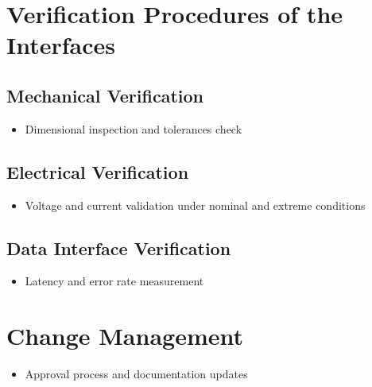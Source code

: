 \documentclass{article}
\begin{document}
\section{Verification Procedures of the Interfaces}

\subsection{Mechanical Verification}
\begin{itemize}
    \item Dimensional inspection and tolerances check
\end{itemize}

\subsection{Electrical Verification}
\begin{itemize}
    \item Voltage and current validation under nominal and extreme conditions
\end{itemize}

\subsection{Data Interface Verification}
\begin{itemize}
    \item Latency and error rate measurement
\end{itemize}


\section{Change Management}

\begin{itemize}
    \item Approval process and documentation updates
\end{itemize}
\end{document}
